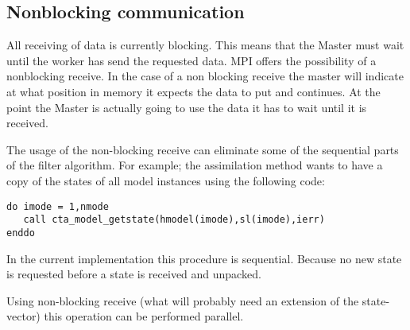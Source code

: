 \subsection{Nonblocking communication} \label{Sec:Nonblocking}
All receiving of data is currently blocking. This means that the Master
must wait until the worker has send the requested data. MPI offers the
possibility of a nonblocking receive. In the case of a non blocking receive
the master will indicate at what position in memory it expects the data to
put and continues. At the point the Master is actually going to use the
data it has to wait until it is received. 

The usage of the non-blocking receive can eliminate some of the sequential
parts of the filter algorithm. For example; the assimilation method wants
to have a copy of the states of all model instances using the following
code:

\begin{verbatim}
do imode = 1,nmode
   call cta_model_getstate(hmodel(imode),sl(imode),ierr)
enddo
\end{verbatim}
In the current implementation this procedure is sequential. Because no new
state is requested before a state is received and unpacked.

Using non-blocking receive (what will probably need an extension of the
state-vector) this operation can be performed parallel.


